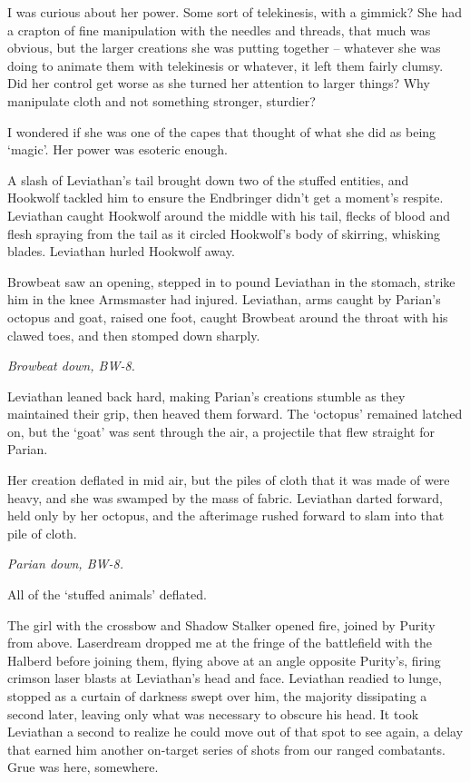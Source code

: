 I was curious about her power.  Some sort of telekinesis, with a gimmick?  She had a crapton of fine manipulation with the needles and threads, that much was obvious, but the larger creations she was putting together – whatever she was doing to animate them with telekinesis or whatever, it left them fairly clumsy.  Did her control get worse as she turned her attention to larger things?  Why manipulate cloth and not something stronger, sturdier?



I wondered if she was one of the capes that thought of what she did as being `magic'.  Her power was esoteric enough.



A slash of Leviathan's tail brought down two of the stuffed entities, and Hookwolf tackled him to ensure the Endbringer didn't get a moment's respite.  Leviathan caught Hookwolf around the middle with his tail, flecks of blood and flesh spraying from the tail as it circled Hookwolf's body of skirring, whisking blades.  Leviathan hurled Hookwolf away.



Browbeat saw an opening, stepped in to pound Leviathan in the stomach, strike him in the knee Armsmaster had injured.  Leviathan, arms caught by Parian's octopus and goat, raised one foot, caught Browbeat around the throat with his clawed toes, and then stomped down sharply.



\emph{Browbeat down, BW-8.}



Leviathan leaned back hard, making Parian's creations stumble as they maintained their grip, then heaved them forward.  The `octopus' remained latched on, but the `goat' was sent through the air, a projectile that flew straight for Parian.



Her creation deflated in mid air, but the piles of cloth that it was made of were heavy, and she was swamped by the mass of fabric.  Leviathan darted forward, held only by her octopus, and the afterimage rushed forward to slam into that pile of cloth.



\emph{Parian down, BW-8.}



All of the `stuffed animals' deflated.



The girl with the crossbow and Shadow Stalker opened fire, joined by Purity from above.   Laserdream dropped me at the fringe of the battlefield with the Halberd before joining them, flying above at an angle opposite Purity's, firing crimson laser blasts at Leviathan's head and face.  Leviathan readied to lunge, stopped as a curtain of darkness swept over him, the majority dissipating a second later, leaving only what was necessary to obscure his head.  It took Leviathan a second to realize he could move out of that spot to see again, a delay that earned him another on-target series of shots from our ranged combatants.  Grue was here, somewhere.



